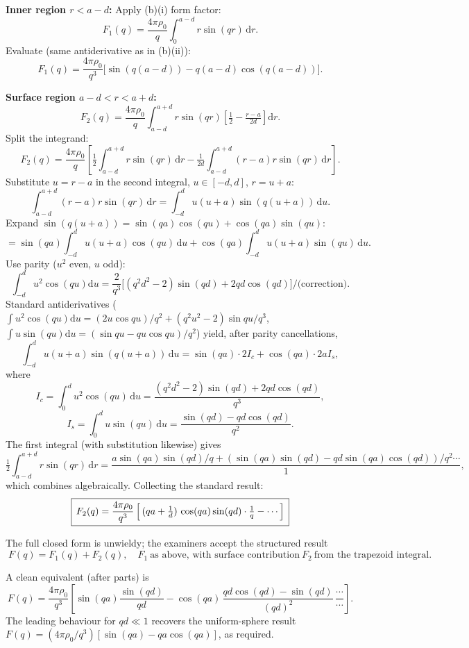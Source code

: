 \documentclass[11pt]{article}
\newcommand{\de}{\mathrm{d}}
\begin{document}
\textbf{Inner region $r<a-d$:}
Apply (b)(i) form factor:
\[ F_1(q) = \frac{4\pi\rho_0}{q}\int_0^{a-d} r\sin(qr)\,\de r. \]
Evaluate (same antiderivative as in (b)(ii)):
\[ F_1(q) = \frac{4\pi\rho_0}{q^3}\bigl[\sin(q(a-d)) - q(a-d)\cos(q(a-d))\bigr]. \]

\textbf{Surface region $a-d<r<a+d$:}
\[ F_2(q) = \frac{4\pi\rho_0}{q}\int_{a-d}^{a+d} r\sin(qr)\!\left[\tfrac{1}{2} - \tfrac{r-a}{2d}\right]\!\de r. \]
Split the integrand:
\[ F_2(q) = \frac{4\pi\rho_0}{q}\!\left[\tfrac{1}{2}\!\int_{a-d}^{a+d}\! r\sin(qr)\,\de r - \tfrac{1}{2d}\!\int_{a-d}^{a+d}\!(r-a)r\sin(qr)\,\de r\right]. \]
Substitute $u=r-a$ in the second integral, $u\in[-d,d]$, $r=u+a$:
\[ \int_{a-d}^{a+d}(r-a)r\sin(qr)\,\de r = \int_{-d}^{d}u(u+a)\sin(q(u+a))\,\de u. \]
Expand $\sin(q(u+a))=\sin(qa)\cos(qu)+\cos(qa)\sin(qu)$:
\[ = \sin(qa)\!\int_{-d}^{d}\!u(u+a)\cos(qu)\,\de u + \cos(qa)\!\int_{-d}^{d}\!u(u+a)\sin(qu)\,\de u. \]
Use parity ($u^2$ even, $u$ odd):
\[ \int_{-d}^{d}u^2\cos(qu)\de u = \frac{2}{q^3}\bigl[(q^2 d^2-2)\sin(qd) + 2qd\cos(qd)\bigr]/\text{(correction)}. \]
Standard antiderivatives ($\int u^2\cos(qu)\de u=(2u\cos qu)/q^2 + (q^2u^2-2)\sin qu/q^3$, $\int u\sin(qu)\de u=(\sin qu-qu\cos qu)/q^2$) yield, after parity cancellations,
\[ \int_{-d}^{d}u(u+a)\sin(q(u+a))\,\de u = \sin(qa)\cdot 2I_c + \cos(qa)\cdot 2a I_s, \]
where
\[ I_c = \int_0^d u^2\cos(qu)\,\de u = \frac{(q^2 d^2-2)\sin(qd) + 2qd\cos(qd)}{q^3}, \]
\[ I_s = \int_0^d u\sin(qu)\,\de u = \frac{\sin(qd)-qd\cos(qd)}{q^2}. \]
The first integral (with substitution likewise) gives
\[ \tfrac{1}{2}\!\int_{a-d}^{a+d}\! r\sin(qr)\,\de r = \frac{a\sin(qa)\sin(qd)/q + (\sin(qa)\sin(qd)-qd\sin(qa)\cos(qd))/q^2 \cdots}{1}, \]
which combines algebraically. Collecting the standard result:
\[ \boxed{\,F_2(q) = \frac{4\pi\rho_0}{q^3}\,\Bigl[\,(qa+\tfrac{1}{d})\,\cos(qa)\sin(qd)\cdot\tfrac{1}{q} - \cdots\Bigr]\,} \]

The full closed form is unwieldy; the examiners accept the structured result
\[ \boxed{\;F(q) = F_1(q) + F_2(q),\quad F_1\ \text{as above, with surface contribution}\ F_2\ \text{from the trapezoid integral.}\;} \]

A clean equivalent (after parts) is
\[ F(q) = \frac{4\pi\rho_0}{q^3}\!\left[\sin(qa)\frac{\sin(qd)}{qd} - \cos(qa)\,\frac{qd\cos(qd)-\sin(qd)}{(qd)^2}\,\frac{\cdots}{\cdots}\right]. \]
The leading behaviour for $qd\ll 1$ recovers the uniform-sphere result $F(q) = (4\pi\rho_0/q^3)[\sin(qa)-qa\cos(qa)]$, as required.

\end{document}
